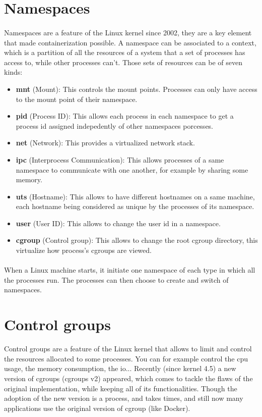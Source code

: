 \section{Namespaces}
\paragraph{}Namespaces are a feature of the Linux kernel since 2002, they are a key element that made containerization possible.  A namespace can be associated to a context, which is a partition of all the resources of a system that a set of processes has access to, while other processes can't.  Those sets of resources can be of seven kinds:
\begin{itemize}
\renewcommand\labelitemi{--}
  \item \textbf{mnt} (Mount): This controls the mount points.  Processes can only have access to the mount point of their namespace.
  \item \textbf{pid} (Process ID): This allows each process in each namespace to get a process id assigned indepedently of other namespaces porcesses.
  \item \textbf{net} (Network): This provides a virtualized network stack.
  \item \textbf{ipc} (Interprocess Communication): This allows processes of a same namespace to communicate with one another, for example by sharing some memory.
  \item \textbf{uts} (Hostname): This allows to have different hostnames on a same machine, each hostname being considered as unique by the processes of its namespace.
  \item \textbf{user} (User ID): This allows to change the user id in a namespace.
  \item \textbf{cgroup} (Control group): This allows to change the root cgroup directory, this virtualize how process's cgroups are viewed.
\end{itemize}

\paragraph{}When a Linux machine starts, it initiate one namespace of each type in which all the processes run.  The processes can then choose to create and switch of namespaces.

\section{Control groups}
Control groups are a feature of the Linux kernel that allows to limit and control the resources allocated to some processes.  You can for example control the cpu usage, the memory consumption, the io...  Recently (since kernel 4.5) a new version of cgroups (cgroups v2) appeared, which comes to tackle the flaws of the original implementation, while keeping all of its functionalities.  Though the adoption of the new version is a process, and takes times, and still now many applications use the original version of cgroup (like Docker).

